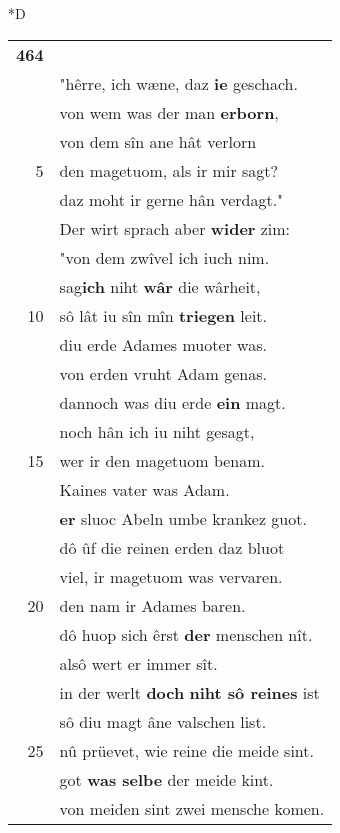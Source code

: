 \documentclass[8pt,a4paper,notitlepage]{article}
\begin{document}
\begin{table}[ht]
\begin{minipage}[t]{0.5\linewidth}
\small
\begin{center}*D
\end{center}
\begin{tabular}{rl}
\textbf{464} & \textit{\begin{large}P\end{large}}arzival \textbf{hin} zim dô sprach:\\ 
 & "hêrre, ich wæne, daz \textbf{ie} geschach.\\ 
 & von wem was der man \textbf{erborn},\\ 
 & von dem sîn ane hât verlorn\\ 
5 & den magetuom, als ir mir sagt?\\ 
 & daz moht ir gerne hân verdagt."\\ 
 & Der wirt sprach aber \textbf{wider} zim:\\ 
 & "von dem zwîvel ich iuch nim.\\ 
 & sag\textbf{ich} niht \textbf{wâr} die wârheit,\\ 
10 & sô lât iu sîn mîn \textbf{triegen} leit.\\ 
 & diu erde Adames muoter was.\\ 
 & von erden vruht Adam genas.\\ 
 & dannoch was diu erde \textbf{ein} magt.\\ 
 & noch hân ich iu niht gesagt,\\ 
15 & wer ir den magetuom benam.\\ 
 & Kaines vater was Adam.\\ 
 & \textbf{er} sluoc Abeln umbe krankez guot.\\ 
 & dô ûf die reinen erden daz bluot\\ 
 & viel, ir magetuom was vervaren.\\ 
20 & den nam ir Adames baren.\\ 
 & dô huop sich êrst \textbf{der} menschen nît.\\ 
 & alsô wert er immer sît.\\ 
 & in der werlt \textbf{doch} \textbf{niht sô reines} ist\\ 
 & sô diu magt âne valschen list.\\ 
25 & nû prüevet, wie reine die meide sint.\\ 
 & got \textbf{was selbe} der meide kint.\\ 
 & von meiden sint zwei mensche komen.\\ 

\end{tabular}
\end{minipage}
\end{table}
\end{document}
